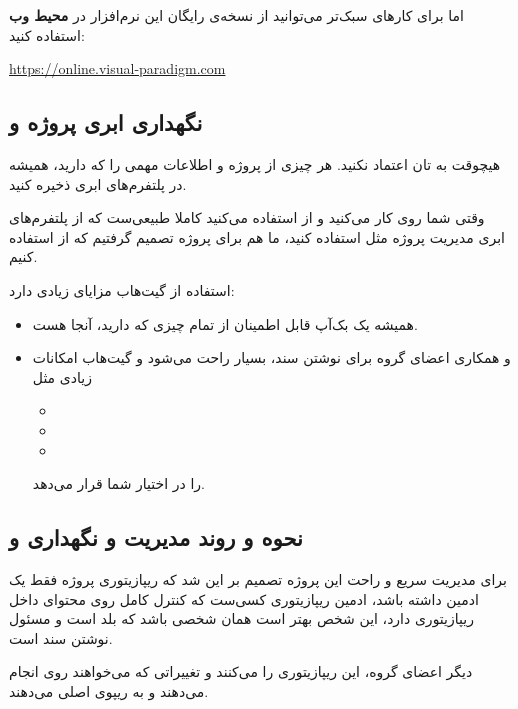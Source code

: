  اما برای کار‌های سبک‌تر می‌توانید از نسخه‌ی رایگان این نرم‌افزار در \textbf{محیط وب} استفاده کنید:
 \begin{latin}
 	\url{https://online.visual-paradigm.com}
 \end{latin}

\subsection{نگهداری ابری پروژه و }
هیچوقت به تان اعتماد نکنید. هر چیزی از پروژه و اطلاعات مهمی را که دارید، همیشه در پلتفرم‌های ابری ذخیره کنید.

وقتی شما روی  کار می‌کنید و از  استفاده می‌کنید کاملا طبیعی‌ست که از پلتفرم‌های ابری مدیریت پروژه مثل  استفاده کنید، ما هم برای پروژه تصمیم گرفتیم که از  استفاده کنیم.

استفاده از گیت‌هاب مزایای زیادی دارد:
\begin{itemize}
	\item 
	همیشه یک بک‌آپ قابل اطمینان از تمام چیزی که دارید، آنجا هست.
	
	\item 
	و همکاری اعضای گروه برای نوشتن سند، بسیار راحت می‌شود و گیت‌هاب امکانات زیادی مثل 
	\begin{itemize}
		\item {}
		\item {}
		\item {}
	\end{itemize}
را در اختیار شما قرار می‌دهد.
\end{itemize}

\subsection{نحوه و روند مدیریت و نگهداری و }
برای مدیریت سریع و راحت این پروژه تصمیم بر این شد که ریپازیتوری پروژه فقط یک ادمین داشته باشد، ادمین ریپازیتوری کسی‌ست که کنترل کامل روی محتوای داخل ریپازیتوری دارد، این شخص بهتر است همان شخصی باشد که \lr{\LaTeX } بلد است و مسئول نوشتن سند است.

دیگر اعضای گروه، این ریپازیتوری را  می‌کنند و تغییراتی که می‌خواهند روی  انجام می‌دهند و به ریپو‌ی اصلی  می‌دهند.

